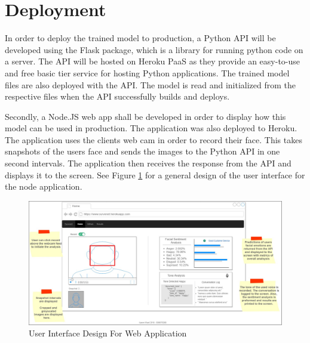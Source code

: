 \section{Deployment}
In order to deploy the trained model to production, a Python API will be developed using the Flask package, which is a library for running python code on a server. The API will be hosted on Heroku PaaS as they provide an easy-to-use and free basic tier service for hosting Python applications. The trained model files are also deployed with the API. The model is read and initialized from the respective files when the API successfully builds and deploys.

Secondly, a Node.JS web app shall be developed in order to display how this model can be used in production. The application was also deployed to Heroku. The application uses the clients web cam in order to record their face. This takes snapshots of the users face and sends the images to the Python API in one second intervals. The application then receives the response from the API and displays it to the screen. 
See Figure \ref{ui} for a general design of the user interface for the node application.


\begin{figure}[ht]
	\begin{center}
		\advance\leftskip-3cm
		\advance\rightskip-3cm
		\includegraphics[keepaspectratio=true,scale=0.29]{__resources/Design/mockup_annotated.jpg}
		\caption{User Interface Design For Web Application}
		\label{ui}
	\end{center}
\end{figure}


